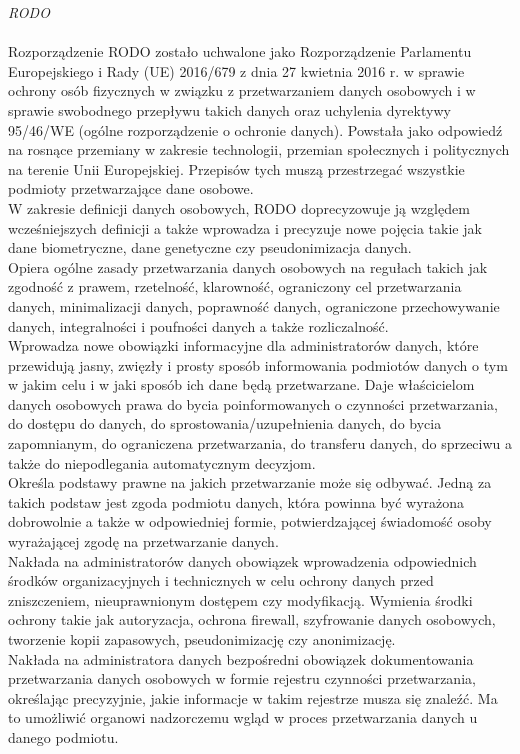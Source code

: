 \documentclass[en, noamssymb]{mgr}
\begin{document}
\indent \textit{RODO} \\ \\
\indent Rozporządzenie RODO zostało uchwalone jako Rozporządzenie Parlamentu Europejskiego i Rady (UE) 2016/679 z dnia 27 kwietnia 2016 r. w sprawie ochrony osób fizycznych w związku z przetwarzaniem danych osobowych i w sprawie
swobodnego przepływu takich danych oraz uchylenia dyrektywy 95/46/WE (ogólne
rozporządzenie o ochronie danych). Powstała jako odpowiedź na rosnące przemiany w zakresie technologii, przemian społecznych i politycznych na terenie Unii Europejskiej. Przepisów tych muszą przestrzegać wszystkie podmioty przetwarzające dane osobowe.\\
\indent W zakresie definicji danych osobowych, RODO doprecyzowuje ją względem wcześniejszych definicji a także wprowadza i precyzuje nowe pojęcia takie jak dane biometryczne, dane genetyczne czy pseudonimizacja danych.\\
\indent Opiera ogólne zasady przetwarzania danych osobowych na regułach takich jak zgodność z prawem, rzetelność, klarowność, ograniczony cel przetwarzania danych, minimalizacji danych, poprawność danych, ograniczone przechowywanie danych, integralności i poufności danych a także rozliczalność.\\
\indent Wprowadza nowe obowiązki informacyjne dla administratorów danych, które przewidują jasny, zwięzły i prosty sposób informowania podmiotów danych o tym w jakim celu i w jaki sposób ich dane będą przetwarzane. Daje właścicielom danych osobowych prawa do bycia poinformowanych o czynności przetwarzania, do dostępu do danych, do sprostowania/uzupełnienia danych, do bycia zapomnianym, do ograniczena przetwarzania, do transferu danych, do sprzeciwu a także do niepodlegania automatycznym decyzjom.\\
\indent Określa podstawy prawne na jakich przetwarzanie może się odbywać. Jedną za takich podstaw jest zgoda podmiotu danych, która powinna być wyrażona dobrowolnie a także w odpowiedniej formie, potwierdzającej świadomość osoby wyrażającej zgodę na przetwarzanie danych. \\
\indent Nakłada na administratorów danych obowiązek wprowadzenia odpowiednich środków organizacyjnych i technicznych w celu ochrony danych przed zniszczeniem, nieuprawnionym dostępem czy modyfikacją. Wymienia środki ochrony takie jak autoryzacja, ochrona firewall, szyfrowanie danych osobowych, tworzenie kopii zapasowych, pseudonimizację czy anonimizację.\\
\indent Nakłada na administratora danych bezpośredni obowiązek dokumentowania przetwarzania danych osobowych w formie rejestru czynności przetwarzania, określając precyzyjnie, jakie informacje w takim rejestrze musza się znaleźć. Ma to umożliwić organowi nadzorczemu wgląd w proces przetwarzania danych u danego podmiotu.\\
\end{document}
